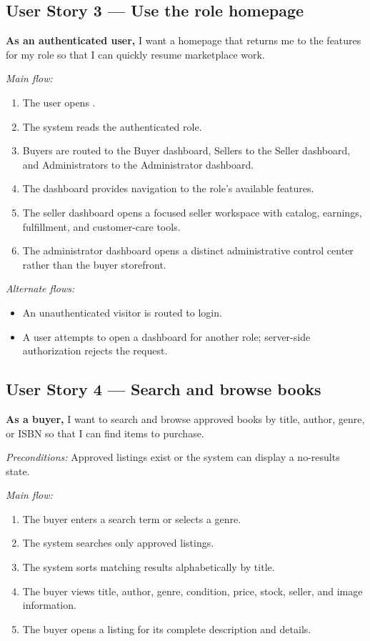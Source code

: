 \documentclass[11pt]{scrreprt}
\newcommand{\code}[1]{\texttt{\detokenize{#1}}}
\begin{document}
\subsection{User Story 3 --- Use the role homepage}
\textbf{As an authenticated user,} I want a homepage that returns me to the
features for my role so that I can quickly resume marketplace work.

\textit{Main flow:}
\begin{enumerate}
\item The user opens \code{/home}.
\item The system reads the authenticated role.
\item Buyers are routed to the Buyer dashboard, Sellers to the Seller
dashboard, and Administrators to the Administrator dashboard.
\item The dashboard provides navigation to the role's available features.
\item The seller dashboard opens a focused seller workspace with catalog,
earnings, fulfillment, and customer-care tools.
\item The administrator dashboard opens a distinct administrative control
center rather than the buyer storefront.
\end{enumerate}

\textit{Alternate flows:}
\begin{itemize}
\item An unauthenticated visitor is routed to login.
\item A user attempts to open a dashboard for another role; server-side
authorization rejects the request.
\end{itemize}

\subsection{User Story 4 --- Search and browse books}
\textbf{As a buyer,} I want to search and browse approved books by title,
author, genre, or ISBN so that I can find items to purchase.

\textit{Preconditions:} Approved listings exist or the system can display a
no-results state.

\textit{Main flow:}
\begin{enumerate}
\item The buyer enters a search term or selects a genre.
\item The system searches only approved listings.
\item The system sorts matching results alphabetically by title.
\item The buyer views title, author, genre, condition, price, stock, seller,
and image information.
\item The buyer opens a listing for its complete description and details.
\end{enumerate}
\end{document}
